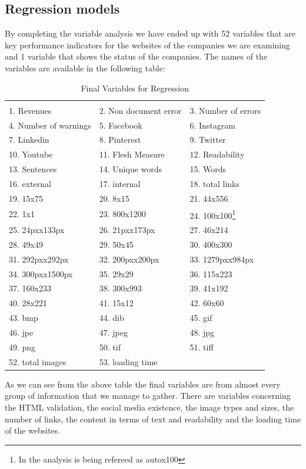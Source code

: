 \documentclass{book}
\begin{document}
\subsection{Regression models}
By completing the variable analysis we have ended up with 52 variables that are key performance indicators for the websites of the companies we are examining and 1 variable that shows the status of the companies. The names of the variables are available in the following table:
\begin{table}[H]
\centering
\caption{Final Variables for Regression}
\begin{tabular}{lll}
\hline & & \\
1.	Revenues
& 2.	Non document error
& 3.	Number of errors
\\4.	Number of warnings
& 5.	Facebook
& 6.	Instagram
\\7.	Linkedin
& 8.	Pinterest
& 9.	Twitter
\\10.	Youtube
& 11.	Flesh Measure
& 12.	Readability
\\13.	Sentences
& 14.	Unique words
& 15.	Words
\\16.	external
& 17.	internal
& 18.	total links
\\19.	15x75
& 20.	8x15
& 21.	44x556
\\22.	1x1
& 23.	800x1200
& 24.	100x100\footnote{In the analysis is being refereed as autox100}
\\25.	24pxx133px
& 26.	21pxx173px
& 27.	46x214
\\28.	49x49
& 29.	50x45
& 30.	400x300
\\31.	292pxx292px
& 32.	200pxx200px
& 33.	1279pxx984px
\\34.	300pxx1500px
& 35.	29x29
& 36.	115x223
\\37.	160x233
& 38.	300x993
& 39.	41x192
\\40.	28x221
& 41.	15x12
& 42.	60x60
\\43.	bmp
& 44.	dib
& 45.	gif
\\46.	jpe
& 47.	jpeg
& 48.	jpg
\\49.	png
& 50.	tif
& 51.	tiff
\\52.	total images
& 53.	loading time     
\\ \hline
\end{tabular}
\end{table}
As we can see from the above table the final variables are from almost every group of information that we manage to gather. There are variables concerning the HTML validation, the social media existence, the image types and sizes, the number of links, the content in terms of text and readability and the loading time of the websites.\\
\end{document}
